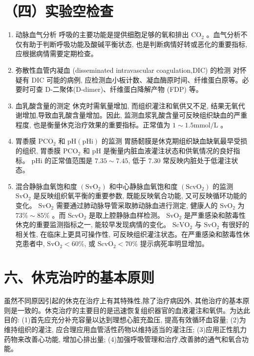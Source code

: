 \documentclass[10pt]{article}
\begin{document}
\section*{（四）实验空检查}
\begin{enumerate}
  \item 动脉血气分析 呼吸的主要功能是提供细胞足够的氧和排出 $\mathrm{CO}_{2}$ 。血气分析不仅有助于判断呼吸功能及酸碱平衡状态, 也是判断病情好转或恶化的重要指标, 应根据病情需要定期检查。

  \item 弥散性血管内凝血 (disseminated intravascular coagulation,DIC) 的检测 对怀疑有 DIC 可能的病例, 应检测血小板计数、凝血酶原时间、纤维蛋白原等。必要时可查 D-二聚体(D-dimer)、纤维蛋白降解产物 (FDP) 等。

  \item 血乳酸含量的测定 休克时需氧量增加, 而组织灌注和氧供又不足, 结果无氧代谢增加,导致血乳酸含量增加。因此, 监测血浆乳酸含量可反映组织缺血的严重程度, 也是衡量休克治疗效果的重要指标。正常值为 $1 \sim 1.5 \mathrm{mmol} / \mathrm{L}$ 。

  \item 胃黍膜 $\mathrm{PCO}_{2}$ 和 $\mathrm{pH}(\mathrm{pHi})$ 的监测 胃肠䵑膜是休克期组织缺血缺氧最早受损的组织, 胃黍膜 $\mathrm{PCO}_{2}$ 和 $\mathrm{pH}$ 是衡量内脏血液灌注状态和供氧情况的良好指标。 $\mathrm{pHi}$ 的正常值范围是 $7.35 \sim 7.45$, 低于 7.30 常反映内脏处于低灌注状态。

  \item 混合静脉血氧饱和度 $\left(\mathrm{SvO}_{2}\right)$ 和中心静脉血氧饱和度 $\left(\mathrm{ScvO}_{2}\right)$ 的监测 $\mathrm{SvO}_{2}$ 是反映组织氧平衡的重要参数, 既能反映氧合功能, 又可反映循环功能的变化。 $\mathrm{SvO}_{2}$ 需要通过肺动脉导管采取肺动脉血进行测定, 健康人的 $\mathrm{SvO}_{2}$ 为 $73 \% \sim 85 \%$ 。而 $\mathrm{ScvO}_{2}$ 是取上腔静脉血样检测。 $\mathrm{SvO}_{2}$ 是严重感染和脓毒性休克的重要监测指标之一, 能较早发现病情的变化。 $\mathrm{ScVO}_{2}$ 与 $\mathrm{SvO}_{2}$ 有很好的相关性, 在临床上更具可操作性, 可反映组织灌注状态。在严重感染和脓毒性休克患者中, $\mathrm{SvO}_{2}<60 \%$, 或 $\mathrm{ScvO}_{2}<70 \%$ 提示病死率明显增加。

\end{enumerate}

\section*{六、休克治咛的基本原则}
虽然不同原因引起的休克在治疗上有其特殊性,除了治疗病因外, 其他治疗的基本原则是一致的。休克治疗的主要目的是迅速恢复组织器官的血液灌注和氧供。为达此目的: (1)首先应充分补充容量以达到理想心脏充盈压, 提高有效循环血容量; (2)为维持组织的灌注, 应合理应用血管活性药物以维持适当的灌注压; (3)应用正性肌力药物来改善心功能, 增加心排出量; (4)加强呼吸管理和治疗,改善肺的通气和氧合功能。
\end{document}
